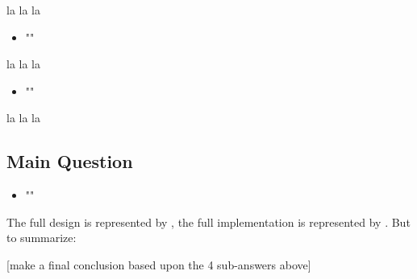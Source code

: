 la la la

\begin{itemize}[ ]
  \item "\mySubRQThree"
\end{itemize}

la la la

\begin{itemize}[ ]
  \item "\mySubRQFour"
\end{itemize}

la la la



\subsection*{Main Question}

\begin{itemize}[ ]
    \item "\myMainRQ"
\end{itemize}

The full design is represented by , the full implementation is represented by . 
But to summarize:

[make a final conclusion based upon the 4 sub-answers above]

